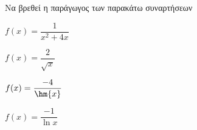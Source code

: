 Να βρεθεί η παράγωγος των παρακάτω συναρτήσεων
\begin{alist}
\item $ f(x)=\dfrac{1}{x^2+4x} $
\item $ f(x)=\dfrac{2}{\sqrt{x}} $
\item $ f(x)=\dfrac{-4}{\hm{x}} $
\item $ f(x)=\dfrac{-1}{\ln{x}} $
\end{alist}
